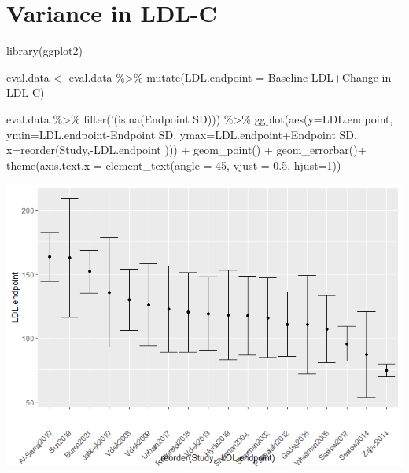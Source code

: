 \documentclass[
]{article}
\newenvironment{Shaded}{\begin{snugshade}}{\end{snugshade}}
\newcommand{\AttributeTok}[1]{\textcolor[rgb]{0.77,0.63,0.00}{#1}}
\newcommand{\DecValTok}[1]{\textcolor[rgb]{0.00,0.00,0.81}{#1}}
\newcommand{\FloatTok}[1]{\textcolor[rgb]{0.00,0.00,0.81}{#1}}
\newcommand{\FunctionTok}[1]{\textcolor[rgb]{0.00,0.00,0.00}{#1}}
\newcommand{\NormalTok}[1]{#1}
\newcommand{\OtherTok}[1]{\textcolor[rgb]{0.56,0.35,0.01}{#1}}
\newcommand{\SpecialCharTok}[1]{\textcolor[rgb]{0.00,0.00,0.00}{#1}}
\newcommand{\StringTok}[1]{\textcolor[rgb]{0.31,0.60,0.02}{#1}}
\begin{document}
\hypertarget{variance-in-ldl-c}{%
\section{Variance in LDL-C}\label{variance-in-ldl-c}}

\begin{Shaded}
\begin{Highlighting}[]
\FunctionTok{library}\NormalTok{(ggplot2)}

\NormalTok{eval.data }\OtherTok{\textless{}{-}}
\NormalTok{  eval.data }\SpecialCharTok{\%\textgreater{}\%}
  \FunctionTok{mutate}\NormalTok{(}\AttributeTok{LDL.endpoint =} \StringTok{\textasciigrave{}}\AttributeTok{Baseline LDL}\StringTok{\textasciigrave{}}\SpecialCharTok{+}\StringTok{\textasciigrave{}}\AttributeTok{Change in LDL{-}C}\StringTok{\textasciigrave{}}\NormalTok{)}

\NormalTok{eval.data }\SpecialCharTok{\%\textgreater{}\%}
  \FunctionTok{filter}\NormalTok{(}\SpecialCharTok{!}\NormalTok{(}\FunctionTok{is.na}\NormalTok{(}\StringTok{\textasciigrave{}}\AttributeTok{Endpoint SD}\StringTok{\textasciigrave{}}\NormalTok{))) }\SpecialCharTok{\%\textgreater{}\%}
  \FunctionTok{ggplot}\NormalTok{(}\FunctionTok{aes}\NormalTok{(}\AttributeTok{y=}\NormalTok{LDL.endpoint,}
             \AttributeTok{ymin=}\NormalTok{LDL.endpoint}\SpecialCharTok{{-}}\StringTok{\textasciigrave{}}\AttributeTok{Endpoint SD}\StringTok{\textasciigrave{}}\NormalTok{,}
             \AttributeTok{ymax=}\NormalTok{LDL.endpoint}\SpecialCharTok{+}\StringTok{\textasciigrave{}}\AttributeTok{Endpoint SD}\StringTok{\textasciigrave{}}\NormalTok{,}
             \AttributeTok{x=}\FunctionTok{reorder}\NormalTok{(Study,}\SpecialCharTok{{-}}\StringTok{\textasciigrave{}}\AttributeTok{LDL.endpoint}\StringTok{\textasciigrave{}}\NormalTok{ ))) }\SpecialCharTok{+}
  \FunctionTok{geom\_point}\NormalTok{() }\SpecialCharTok{+}
  \FunctionTok{geom\_errorbar}\NormalTok{()}\SpecialCharTok{+}
  \FunctionTok{theme}\NormalTok{(}\AttributeTok{axis.text.x =} \FunctionTok{element\_text}\NormalTok{(}\AttributeTok{angle =} \DecValTok{45}\NormalTok{, }\AttributeTok{vjust =} \FloatTok{0.5}\NormalTok{, }\AttributeTok{hjust=}\DecValTok{1}\NormalTok{))}
\end{Highlighting}
\end{Shaded}

\includegraphics{figures/ldlc-endpoint-1.png}
\end{document}
